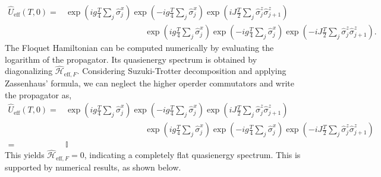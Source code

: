 \documentclass[a4paper,10pt]{article}
\begin{document}
\begin{align}
    \hat{U}_{\text{eff}}(T,0) =& 
    \exp\left(i g \frac{T}{4} \sum_{j}\hat{\sigma}_j^x\right)
    \exp\left(-i g \frac{T}{4} \sum_{j}\hat{\sigma}_j^x\right)\exp\left(i J \frac{T}{2} \sum_{j} \hat{\sigma}_j^z \hat{\sigma}_{j+1}^z\right)\nonumber\\
    &\hspace{4cm}\exp\left(i g \frac{T}{4} \sum_{j}\hat{\sigma}_j^x\right)\exp\left(-i g \frac{T}{4} \sum_{j}\hat{\sigma}_j^x\right)\exp\left(-i J \frac{T}{2} \sum_{j} \hat{\sigma}_j^z \hat{\sigma}_{j+1}^z\right).
\end{align}
The Floquet Hamiltonian can be computed numerically by evaluating the logarithm of the propagator. Its quasienergy spectrum is obtained by diagonalizing $\hat{\mathcal{H}}_{\text{eff},F}$. 
Considering Suzuki-Trotter decomposition and applying  Zassenhaus’ formula, we can neglect the higher operder commutators and write the propagator as,
\begin{align}
    \hat{U}_{\text{eff}}(T,0) =& 
        \exp\left(i g \frac{T}{4} \sum_{j}\hat{\sigma}_j^x\right)
        \exp\left(-i g \frac{T}{4} \sum_{j}\hat{\sigma}_j^x\right)\exp\left(i J \frac{T}{2} \sum_{j} \hat{\sigma}_j^z \hat{\sigma}_{j+1}^z\right)\nonumber\\
        &\hspace{4cm}\exp\left(i g \frac{T}{4} \sum_{j}\hat{\sigma}_j^x\right)\exp\left(-i g \frac{T}{4} \sum_{j}\hat{\sigma}_j^x\right)\exp\left(-i J \frac{T}{2} \sum_{j} \hat{\sigma}_j^z \hat{\sigma}_{j+1}^z\right)\nonumber\\
        =& \mathbb{I}
\end{align}
This yields $\hat{\mathcal{H}}_{\text{eff},F} = 0$, indicating a completely flat quasienergy spectrum. This is supported by numerical results, as shown below.



\printbibliography{}
\end{document}
